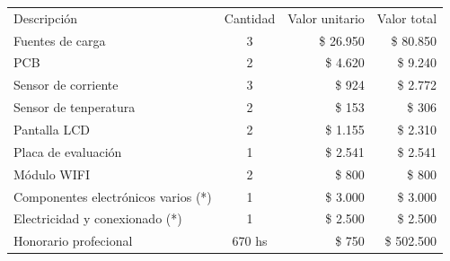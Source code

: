 \documentclass[11pt]{charter}
\begin{document}
\begin{table}[H]
\centering
\begin{tabularx}{\linewidth}{@{}|X|c|r|r|@{}}
\hline
\rowcolor[HTML]{C0C0C0} 
\multicolumn{4}{|c|}{\cellcolor[HTML]{C0C0C0}\textbf{COSTOS DIRECTOS}} \\ \hline
\rowcolor[HTML]{C0C0C0} 
Descripción &
  \multicolumn{1}{c|}{\cellcolor[HTML]{C0C0C0}Cantidad} &
  \multicolumn{1}{c|}{\cellcolor[HTML]{C0C0C0}Valor unitario} &
  \multicolumn{1}{c|}{\cellcolor[HTML]{C0C0C0}Valor total} \\ \hline
 
 Fuentes de carga &
  \multicolumn{1}{c|}{3} &
  \multicolumn{1}{r|}{\$ 26.950} &
  \multicolumn{1}{r|}{\$ 80.850} \\ \hline
 
 PCB &
  \multicolumn{1}{c|}{2} &
  \multicolumn{1}{r|}{\$ 4.620} &
  \multicolumn{1}{r|}{\$ 9.240} \\ \hline
 
 Sensor de corriente &
  \multicolumn{1}{c|}{3} &
  \multicolumn{1}{r|}{\$ 924} &
  \multicolumn{1}{r|}{\$ 2.772} \\ \hline
  
 Sensor de tenperatura &
  \multicolumn{1}{c|}{2} &
  \multicolumn{1}{r|}{\$ 153} &
  \multicolumn{1}{r|}{\$ 306} \\ \hline 
  
 Pantalla LCD &
  \multicolumn{1}{c|}{2} &
  \multicolumn{1}{r|}{\$ 1.155} &
  \multicolumn{1}{r|}{\$ 2.310} \\ \hline
  
 Placa de evaluación &
  \multicolumn{1}{c|}{1} &
  \multicolumn{1}{r|}{\$ 2.541} &
  \multicolumn{1}{r|}{\$ 2.541} \\ \hline 
  
 Módulo WIFI &
  \multicolumn{1}{c|}{2} &
  \multicolumn{1}{r|}{\$ 800} &
  \multicolumn{1}{r|}{\$ 800} \\ \hline 
  
 Componentes electrónicos varios (*) &
  \multicolumn{1}{c|}{1} &
  \multicolumn{1}{r|}{\$ 3.000} &
  \multicolumn{1}{r|}{\$ 3.000} \\ \hline
  
 Electricidad y conexionado (*)&
  \multicolumn{1}{c|}{1} &
  \multicolumn{1}{r|}{\$ 2.500} &
  \multicolumn{1}{r|}{\$ 2.500} \\ \hline
 
 Honorario profecional &
  \multicolumn{1}{c|}{670 hs} &
  \multicolumn{1}{r|}{\$ 750} &
  \multicolumn{1}{r|}{\$ 502.500} \\ \hline
  

\end{tabularx}
\end{table}
\end{document}
